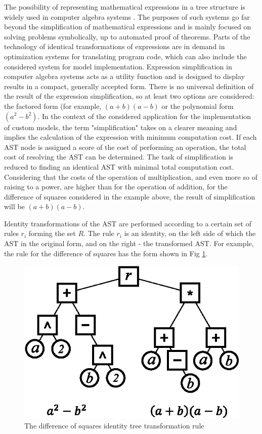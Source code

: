 \documentclass[lettersize,journal]{IEEEtran}
\begin{document}
The possibility of representing mathematical expressions in a tree structure is widely used in computer algebra systems \cite{gathen13}. 
The purposes of such systems go far beyond the simplification of mathematical expressions and is mainly focused on solving problems symbolically,
up to automated proof of theorems. Parts of the technology of identical transformations of expressions are in demand in optimization systems for translating program
code, which can also include the considered system for model implementation. Expression simplification in computer algebra systems acts as a utility function 
and is designed to display results in a compact, generally accepted form. There is no universal definition of the result of the expression simplification, so at
least two options are considered: the factored form (for example, \((a+b)(a-b)\) or the polynomial form \((a ^ 2-b ^ 2)\). In the context of 
the considered application for the implementation of custom models, the term "simplification" takes on a clearer meaning and implies the calculation of the
expression with minimum computation cost. If each AST node is assigned a score of the cost of performing an operation, the total cost of resolving the AST 
can be determined. The task of simplification is reduced to finding an identical AST with minimal total computation cost. Considering that the costs of 
the operation of multiplication, and even more so of raising to a power, are higher than for the operation of addition, for the difference of squares 
considered in the example above, the result of simplification will be \((a+b)(a-b)\).

Identity transformations of the AST are performed according to a certain set of rules \(r_i\) forming the set \(R\). The rule \(r_i\) is an identity, 
on the left side of which the AST in the original form, and on the right - the transformed AST. For example, the rule for the difference of squares has the form shown in Fig \ref{fig_simpl}.

\begin{figure}[h]
	\centering
	\includegraphics[width=.7\columnwidth]{simplification.eps}
	\caption{The difference of squares identity tree transformation rule}
	\label{fig_simpl}
\end{figure}
\end{document}
